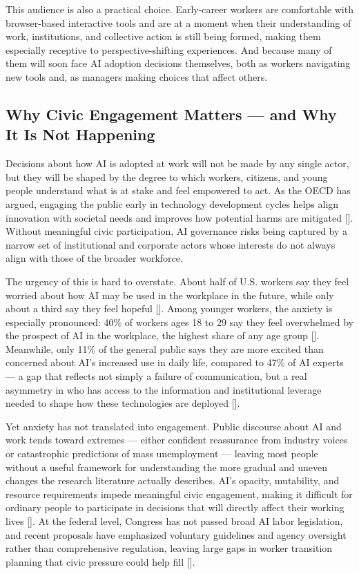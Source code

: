 \documentclass[sigconf,authordraft]{acmart}
\begin{document}
This audience is also a practical choice. Early-career workers are comfortable with browser-based interactive tools and are at a moment when their understanding of work, institutions, and collective action is still being formed, making them especially receptive to perspective-shifting experiences. And because many of them will soon face AI adoption decisions themselves, both as workers navigating new tools and, as managers making choices that affect others. 

\subsection{Why Civic Engagement Matters — and Why It Is Not Happening}

Decisions about how AI is adopted at work will not be made by any single actor, but they will be shaped by the degree to which workers, citizens, and young people understand what is at stake and feel empowered to act. As the OECD has argued, engaging the public early in technology development cycles helps align innovation with societal needs and improves how potential harms are mitigated [\cite{oecd2024trust}]. Without meaningful civic participation, AI governance risks being captured by a narrow set of institutional and corporate actors whose interests do not always align with those of the broader workforce.

The urgency of this is hard to overstate. About half of U.S. workers say they feel worried about how AI may be used in the workplace in the future, while only about a third say they feel hopeful [\cite{pew2025workers}]. Among younger workers, the anxiety is especially pronounced: 40\% of workers ages 18 to 29 say they feel overwhelmed by the prospect of AI in the workplace, the highest share of any age group [\cite{pew2025workers}]. Meanwhile, only 11\% of the general public says they are more excited than concerned about AI's increased use in daily life, compared to 47\% of AI experts — a gap that reflects not simply a failure of communication, but a real asymmetry in who has access to the information and institutional leverage needed to shape how these technologies are deployed [\cite{pew2025experts}].

Yet anxiety has not translated into engagement. Public discourse about AI and work tends toward extremes — either confident reassurance from industry voices or catastrophic predictions of mass unemployment — leaving most people without a useful framework for understanding the more gradual and uneven changes the research literature actually describes. AI's opacity, mutability, and resource requirements impede meaningful civic engagement, making it difficult for ordinary people to participate in decisions that will directly affect their working lives [\cite{sieber2025civic}]. At the federal level, Congress has not passed broad AI labor legislation, and recent proposals have emphasized voluntary guidelines and agency oversight rather than comprehensive regulation, leaving large gaps in worker transition planning that civic pressure could help fill [\cite{crs2025federal}].
\end{document}
